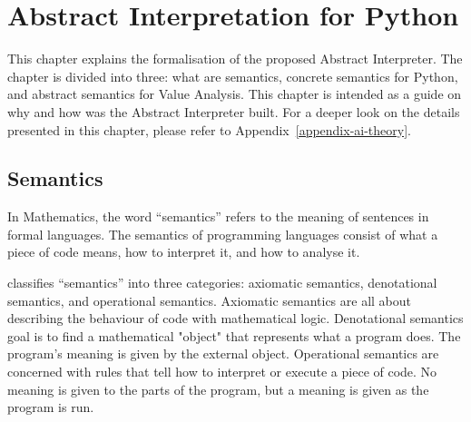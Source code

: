 \chapter{Abstract Interpretation for Python}\label{ai-for-python}



This chapter explains the formalisation of the proposed Abstract Interpreter. The chapter
is divided into three: what are semantics, concrete semantics for Python, and
abstract semantics for Value Analysis. This chapter is intended as a guide on why and how
was the Abstract Interpreter built. For a deeper look on the details presented in this
chapter, please refer to Appendix~\ref{appendix-ai-theory}.

\section{Semantics}

In Mathematics, the word \enquote{semantics} refers to the meaning of sentences in formal
languages. The semantics of programming languages
consist of what a piece of code means, how to interpret it, and how to analyse it.

 classifies \enquote{semantics} into three categories:
axiomatic semantics, denotational semantics, and operational semantics. Axiomatic
semantics are all about describing the behaviour of code with mathematical logic.
Denotational semantics goal is to find a mathematical "object" that represents what a
program does. The program's meaning is given by the external object.
Operational semantics are concerned with rules that tell how to interpret or execute a
piece of code. No meaning is given to the parts of the program, but a meaning is given as
the program is run.


